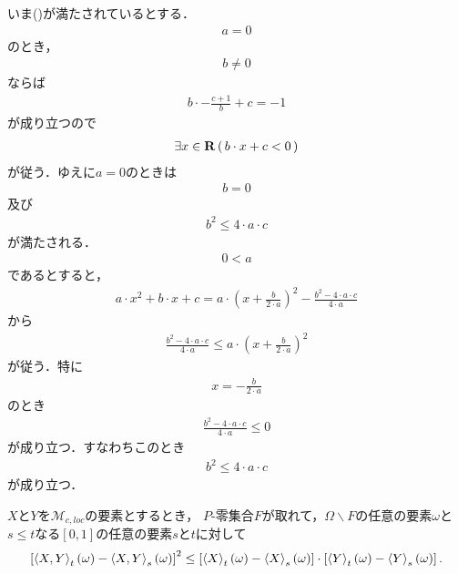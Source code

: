 	\begin{sketch}
		いま()が満たされているとする．
		\begin{align}
			a=0
		\end{align}
		のとき，
		\begin{align}
			b \neq 0
		\end{align}
		ならば
		\begin{align}
			b \cdot -\frac{c+1}{b} + c = -1
		\end{align}
		が成り立つので
		\begin{align}
			\exists x \in \mathbf{R}\, (\, b \cdot x + c < 0\, )
		\end{align}
		が従う．ゆえに$a=0$のときは
		\begin{align}
			b = 0
		\end{align}
		及び
		\begin{align}
			b^{2} \leq 4 \cdot a \cdot c
		\end{align}
		が満たされる．
		\begin{align}
			0 < a
		\end{align}
		であるとすると，
		\begin{align}
			a \cdot x^{2} + b \cdot x + c
			= a \cdot \left(x+\frac{b}{2 \cdot a}\right)^{2} - \frac{b^{2} - 4 \cdot a \cdot c}{4 \cdot a}
		\end{align}
		から
		\begin{align}
			\frac{b^{2} - 4 \cdot a \cdot c}{4 \cdot a}
			\leq a \cdot \left(x+\frac{b}{2 \cdot a}\right)^{2}
		\end{align}
		が従う．特に
		\begin{align}
			x = -\frac{b}{2 \cdot a}
		\end{align}
		のとき
		\begin{align}
			\frac{b^{2} - 4 \cdot a \cdot c}{4 \cdot a} \leq 0
		\end{align}
		が成り立つ．すなわちこのとき
		\begin{align}
			b^{2} \leq 4 \cdot a \cdot c
		\end{align}
		が成り立つ．
		\QED
	\end{sketch}
	
	\begin{screen}
		\begin{thm}[二次変分に対するSchwartzの不等式]
		\label{thm:Schwartz_inequality_for_quadratic_variations}
			$X$と$Y$を$\mathscr{M}_{c,loc}$の要素とするとき，
			$P$-零集合$F$が取れて，$\Omega \backslash F$の任意の要素$\omega$と
			$s \leq t$なる$[0,1]$の任意の要素$s$と$t$に対して
			\begin{align}
				\left[\inprod<X,Y>_{t}(\omega) - \inprod<X,Y>_{s}(\omega)\right]^{2}
				\leq \left[\inprod<X>_{t}(\omega) - \inprod<X>_{s}(\omega)\right] 
				\cdot \left[\inprod<Y>_{t}(\omega) - \inprod<Y>_{s}(\omega)\right].
			\end{align}
		\end{thm}
	\end{screen}
	
